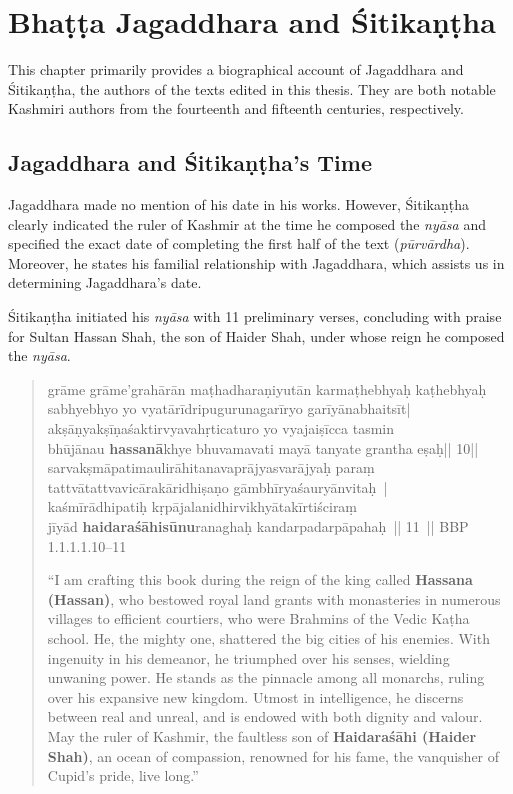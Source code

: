\chapter{Bhaṭṭa Jagaddhara and Śitikaṇṭha}

This chapter primarily provides a biographical account of Jagaddhara and Śitikaṇṭha, the authors of the texts edited in this thesis. They are both notable Kashmiri authors from the fourteenth and fifteenth centuries, respectively.

\section{Jagaddhara and Śitikaṇṭha's Time}

Jagaddhara made no mention of his date in his works. However, Śitikaṇṭha clearly indicated the ruler of Kashmir at the time he composed the \emph{nyāsa} and specified the exact date of completing the first half of the text (\emph{pūrvārdha}). Moreover, he states his familial relationship with Jagaddhara, which assists us in determining Jagaddhara's date.

Śitikaṇṭha initiated his \emph{nyāsa} with 11 preliminary verses, concluding with praise for Sultan Hassan Shah, the son of Haider Shah, under whose reign he composed the \emph{nyāsa}.

\begin{quote}	
	\textsanskrit{grāme grāme'grahārān maṭhadharaṇiyutān karmaṭhebhyaḥ kaṭhebhyaḥ\\
	sabhyebhyo yo vyatārīdripugurunagarīryo garīyānabhaitsīt|\\
	akṣāṇyakṣīṇaśaktirvyavahṛticaturo yo vyajaiṣīcca tasmin\\
	bhūjānau \textbf{hassanā}khye bhuvamavati mayā tanyate grantha eṣaḥ|| 10||\\
	sarvakṣmāpatimaulirāhitanavaprājyasvarājyaḥ paraṃ\\
	tattvātattvavicārakāridhiṣaṇo gāmbhīryaśauryānvitaḥ |\\	
	kaśmīrādhipatiḥ kṛpājalanidhirvikhyātakīrtiściraṃ\\
	jīyād \textbf{haidaraśāhisūnu}ranaghaḥ kandarpadarpāpahaḥ || 11 ||}
	BBP 1.1.1.1.10--11
	

	“I am crafting this book during the reign of the king called \textbf{Hassana (Hassan)}, who bestowed royal land grants with monasteries in numerous villages to efficient courtiers, who were Brahmins of the Vedic Kaṭha school. He, the mighty one, shattered the big cities of his enemies. With ingenuity in his demeanor, he triumphed over his senses, wielding unwaning power. He stands as the pinnacle among all monarchs, ruling over his expansive new kingdom. Utmost in intelligence, he discerns between real and unreal, and is endowed with both dignity and valour. May the ruler of Kashmir, the faultless son of \textbf{Haidaraśāhi (Haider Shah)}, an ocean of compassion, renowned for his fame, the vanquisher of Cupid's pride, live long.”	
\end{quote}



